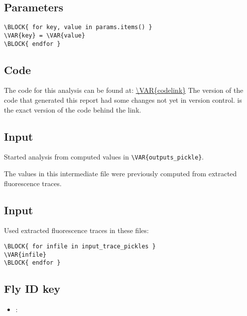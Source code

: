 \documentclass{article}
\begin{document}
\begin{flushleft}
\subsection{Parameters}
\begin{verbatim}
\BLOCK{ for key, value in params.items() }
\VAR{key} = \VAR{value}
\BLOCK{ endfor }
\end{verbatim}

\subsection{Code}
The code for this analysis can be found at:
\linebreak
\url{\VAR{codelink}}
\linebreak
The version of the code that generated this report  had some changes not yet in version control.   is the exact version of the code behind the link.


\subsection{Input}
Started analysis from computed values in \verb=\VAR{outputs_pickle}=.

The values in this intermediate file were previously computed from extracted
fluorescence traces.

\subsection{Input}
Used extracted fluorescence traces in these files:
\begin{verbatim}
\BLOCK{ for infile in input_trace_pickles }
\VAR{infile}
\BLOCK{ endfor }
\end{verbatim}

\subsection{Fly ID key}
\begin{itemize}
  \item {}: 
\end{itemize}

\pagebreak
{}

\end{flushleft}
\end{document}
